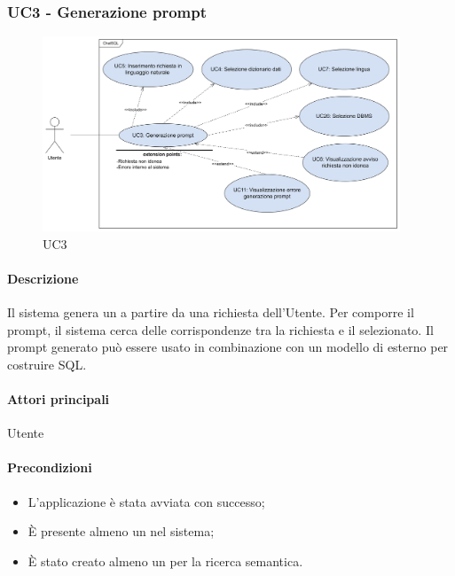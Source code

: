 \subsubsection{UC3 - Generazione prompt}\label{UC3}

\begin{figure}[H]
  \centering
  \includegraphics[width=0.95\textwidth]{assets/uc3.png}
  \caption{UC3}
\end{figure}

\paragraph*{Descrizione}
Il sistema genera un  a partire da una richiesta dell'Utente. Per comporre il prompt, il sistema cerca delle corrispondenze tra la richiesta e il  selezionato. Il prompt generato può essere usato in combinazione con un modello di  esterno per costruire  SQL.

\paragraph*{Attori principali}
Utente

\paragraph*{Precondizioni}
\begin{itemize}
  \item L'applicazione è stata avviata con successo;
  \item È presente almeno un  nel sistema;
  \item È stato creato almeno un  per la ricerca semantica.
\end{itemize}

